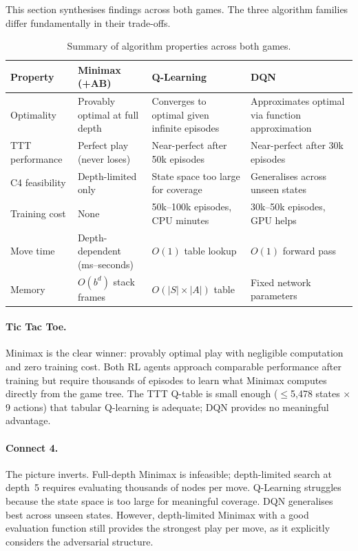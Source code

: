 \documentclass[12pt, a4paper]{article}
\begin{document}
This section synthesises findings across both games. The three algorithm families differ
fundamentally in their trade-offs.

\begin{table}[H]
\centering
\caption{Summary of algorithm properties across both games.}
\label{tab:summary}
\small
\begin{tabular}{p{2.6cm}p{3.5cm}p{3.5cm}p{3.5cm}}
\toprule
\textbf{Property} & \textbf{Minimax (+AB)} & \textbf{Q-Learning} & \textbf{DQN} \\
\midrule
Optimality &
    Provably optimal at full depth &
    Converges to optimal given infinite episodes &
    Approximates optimal via function approximation \\
\addlinespace
TTT performance &
    Perfect play (never loses) &
    Near-perfect after 50k episodes &
    Near-perfect after 30k episodes \\
\addlinespace
C4 feasibility &
    Depth-limited only &
    State space too large for coverage &
    Generalises across unseen states \\
\addlinespace
Training cost &
    None &
    50k--100k episodes, CPU minutes &
    30k--50k episodes, GPU helps \\
\addlinespace
Move time &
    Depth-dependent (ms--seconds) &
    $O(1)$ table lookup &
    $O(1)$ forward pass \\
\addlinespace
Memory &
    $O(b^d)$ stack frames &
    $O(|S| \times |A|)$ table &
    Fixed network parameters \\
\bottomrule
\end{tabular}
\end{table}

\paragraph{Tic Tac Toe.}
Minimax is the clear winner: provably optimal play with negligible computation and zero
training cost. Both RL agents approach comparable performance after training but require
thousands of episodes to learn what Minimax computes directly from the game tree. The TTT
Q-table is small enough ($\leq$5,478 states $\times$ 9 actions) that tabular Q-learning is
adequate; DQN provides no meaningful advantage.

\paragraph{Connect 4.}
The picture inverts. Full-depth Minimax is infeasible; depth-limited search at depth~5
requires evaluating thousands of nodes per move. Q-Learning struggles because the state space
is too large for meaningful coverage. DQN generalises best across unseen states. However,
depth-limited Minimax with a good evaluation function still provides the strongest play per
move, as it explicitly considers the adversarial structure.
\end{document}
